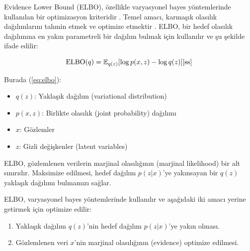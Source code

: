 \documentclass[12pt, a4paper]{article}
\begin{document}
			Evidence Lower Bound (ELBO), özellikle varyasyonel bayes yöntemlerinde kullanılan bir optimizasyon kriteridir\cite{ha} \cite{mb}. Temel amacı, karmaşık olasılık dağılımlarını tahmin etmek ve optimize etmektir\cite{yb} \cite{yt}. ELBO, bir hedef olasılık dağılımına en yakın parametreli bir dağılım bulmak için kullanılır ve şu şekilde ifade edilir:
			
			\begin{equation}
				\text{ELBO}(q) = \mathbb{E}_{q(z)}[\log p(x, z) - \log q(z)] \label{eq:elbo} \cite{ss}
			\end{equation}
			
			Burada (\ref{eq:elbo}):
			\begin{itemize}
				\item \( q(z) \): Yaklaşık dağılım (variational distribution)
				\item \( p(x, z) \): Birlikte olasılık (joint probability) dağılımı
				\item \( x \): Gözlemler
				\item \( z \): Gizli değişkenler (latent variables)
			\end{itemize}
			
			ELBO, gözlemlenen verilerin marjinal olasılığının (marjinal likelihood) bir alt sınırıdır. Maksimize edilmesi, hedef dağılım \( p(z|x) \)'ye yakınsayan bir \( q(z) \) yaklaşık dağılımı bulmamızı sağlar.
			
			ELBO, varyasyonel bayes yöntemlerinde kullanılır ve aşağıdaki iki amacı yerine getirmek için optimize edilir:
			\begin{enumerate}
				\item Yaklaşık dağılım \( q(z) \)'nin hedef dağılım \( p(z|x) \)'ye yakın olması.
				\item Gözlemlenen veri \( x \)'nin marjinal olasılığının (evidence) optimize edilmesi.
			\end{enumerate}
			
\end{document}
